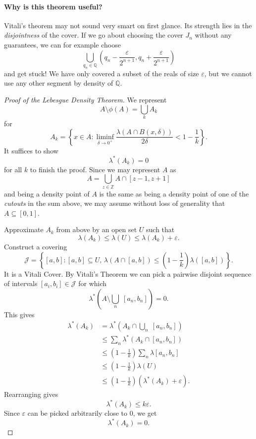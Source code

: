 \paragraph{Why is this theorem useful?} Vitali's theorem may not sound very smart on first glance. Its strength lies in the \emph{disjointness} of the cover. If we go about choosing the cover \( J_n \) without any guarantees, we can for example choose
\[ 
    \bigcup_{q_n \in \mathbb{Q}} (q_n - \frac{\varepsilon}{2^{n+1}}, q_n + \frac{\varepsilon }{2^{n+1}}) 
\]
and get stuck! We have only covered a subset of the reals of size \(\varepsilon \), but we cannot use any other segment by density of \( \mathbb{Q} \).
\begin{proof}[Proof of the Lebesgue Density Theorem]
    We represent
    \[ 
    A \setminus \phi(A) = \bigcup_k A_k      
   \]
   for
   \[ 
       A_k = \left\{ x \in A : \liminf_{\delta \to 0^+} \frac{\lambda(A \cap B(x,\delta))}{2\delta} < 1 - \frac{1}{k} \right\}.
  \]
  It suffices to show
  \[ 
     \lambda^*(A_k) = 0 
 \]
 for all \( k \) to finish the proof. Since we may represent \( A \) as
 \[ 
     A = \bigcup_{z \in \mathbb{Z}} A \cap [z-1, z+1] 
\]
and being a density point of \( A \) is the same as being a density point of one of the \emph{cutouts} in the sum above, we may assume without loss of generality that \( A \subseteq [0,1] \).

Approximate \( A_k \) from above by an open set \( U \) such that
\[ 
    \lambda(A_k) \leqslant \lambda(U) \leqslant \lambda(A_k) + \varepsilon.
\]
Construct a covering
\[ 
    \mathcal{J} = \left\{ [a,b] : [a,b] \subseteq U,\,\lambda(A \cap [a,b]) \leqslant \left(1 - \frac{1}{k}\right)\lambda([a,b])\right\}.
\]
It is a Vitali Cover. By Vitali's Theorem we can pick a pairwise disjoint sequence of intervals \( [a_i, b_i] \in \mathcal{J}\) for which
\[ 
    \lambda^*\left( A \setminus \bigcup_n\; [a_n, b_n]\right) = 0.
\]
This gives
\begin{align*}
    \lambda^* (A_k) &=\lambda^*\left(A_k \cap \bigcup_n \; [a_n, b_n] \right) \\
                    &\leqslant \sum_n \lambda^*(A_k \cap [a_n, b_n] ) \\
                    &\leqslant \left( 1 - \frac{1}{k} \right) \sum_n\lambda[a_n, b_n] \\
                    &\leqslant \left( 1 - \frac{1}{k} \right)\lambda(U) \\
                    &\leqslant \left( 1 - \frac{1}{k} \right) \left(\lambda^*(A_k) +\varepsilon \right).
\end{align*}
Rearranging gives
\[ 
   \lambda^*(A_k) \leqslant k\varepsilon. 
\]
Since \(\varepsilon \) can be picked arbitrarily close to 0, we get
\[ 
   \lambda^*(A_k) = 0. 
\]

\end{proof}

